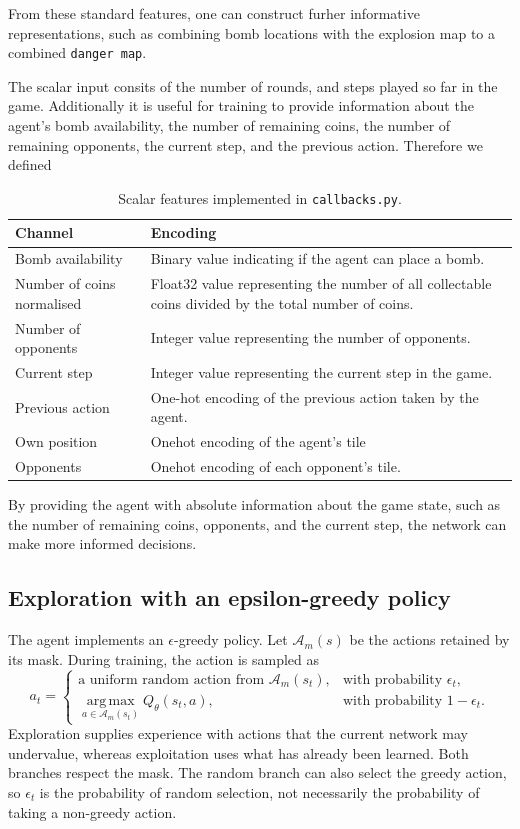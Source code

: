 \documentclass[11pt,a4paper]{article}
\begin{document}
From these standard features, one can construct furher informative representations, such as combining bomb locations with the explosion map to a combined \texttt{danger map}.

The scalar input consits of the number of rounds, and steps played so far in the game.
Additionally it is useful for training to provide information about the agent's bomb availability, the number of remaining coins, the number of remaining opponents, the current step, and the previous action. Therefore we defined

\begin{table}[htbp]
\centering
\small
\begin{tabularx}{\textwidth}{@{}lY@{}}
\toprule
Channel & Encoding \\
\midrule
Bomb availability & Binary value indicating if the agent can place a bomb. \\
Number of coins normalised & Float32 value representing the number of all collectable coins divided by the total number of coins. \\
Number of opponents & Integer value representing the number of opponents. \\
Current step & Integer value representing the current step in the game. \\
Previous action & One-hot encoding of the previous action taken by the agent. \\
Own position & Onehot encoding of the agent's tile\\
Opponents & Onehot encoding of each opponent's tile. \\
\bottomrule
\end{tabularx}
\caption{Scalar features implemented in \texttt{callbacks.py}.}
\label{tab:scalar-features}
\end{table}

By providing the agent with absolute information about the game state, such as the number of remaining coins, opponents, and the current step, the network can make more informed decisions.


\subsection{Exploration with an epsilon-greedy policy}
The agent implements an $\epsilon$-greedy policy. Let $\mathcal{A}_m(s)$ be
the actions retained by its mask. During training, the action is sampled as
\begin{equation}
a_t=\begin{cases}
\text{a uniform random action from }\mathcal{A}_m(s_t),
& \text{with probability }\epsilon_t,\\
\displaystyle\operatorname*{arg\,max}_{a\in\mathcal{A}_m(s_t)}
Q_\theta(s_t,a), & \text{with probability }1-\epsilon_t.
\end{cases}
\end{equation}
Exploration supplies experience with actions that the current network may
undervalue, whereas exploitation uses what has already been learned. Both branches
respect the mask. The random branch can also select the greedy action, so
$\epsilon_t$ is the probability of random selection, not necessarily the
probability of taking a non-greedy action.
\end{document}
